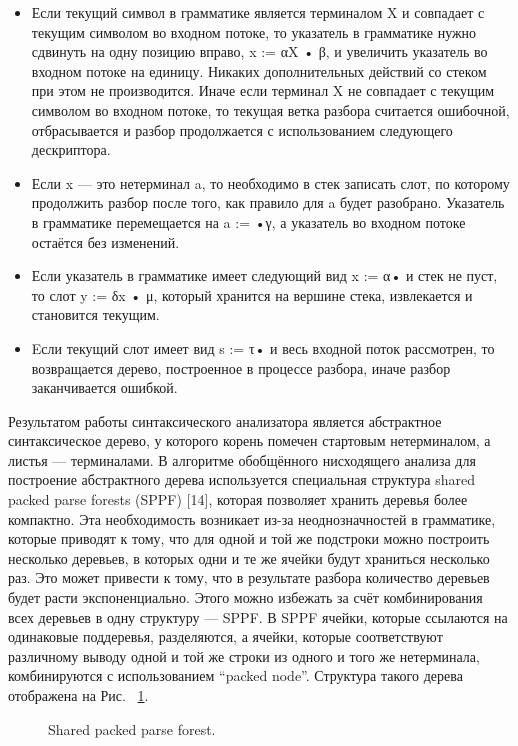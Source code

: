 \begin{itemize}
\item Если текущий символ в грамматике является терминалом X и совпадает с текущим символом во входном потоке, то указатель в грамматике нужно сдвинуть на одну позицию вправо, x := αX • β, и увеличить указатель во входном потоке на единицу. Никаких дополнительных действий со стеком при этом не производится. Иначе если терминал X не совпадает с текущим символом во входном потоке, то текущая ветка разбора считается ошибочной, отбрасывается и разбор продолжается с использованием следующего дескриптора.
\item Если x --- это нетерминал a, то необходимо в стек записать слот, по которому продолжить разбор после того, как правило для a будет разобрано. Указатель в грамматике перемещается на a := •γ, а указатель во входном потоке остаётся без изменений.
\item Если указатель в грамматике имеет следующий вид x := α• и стек не пуст, то слот y := δx • μ, который хранится на вершине стека, извлекается и становится текущим.
\item Eсли текущий слот имеет вид s := τ• и весь входной поток рассмотрен, то возвращается дерево, построенное в процессе разбора, иначе разбор заканчивается ошибкой.
\end{itemize}

Результатом работы синтаксического анализатора является абстрактное синтаксическое дерево, у которого корень помечен стартовым нетерминалом, а листья --- терминалами. В алгоритме обобщённого нисходящего анализа для построение абстрактного дерева используется специальная структура shared packed parse forests (SPPF) [14], которая позволяет хранить деревья более компактно. Эта необходимость возникает из-за неоднозначностей в грамматике, которые приводят к тому, что для одной и той же подстроки можно построить несколько деревьев, в которых одни и те же ячейки будут храниться несколько раз. Это может привести к тому, что в результате разбора количество деревьев будет расти экспоненциально. Этого можно избежать за счёт комбинирования всех деревьев в одну структуру --- SPPF. В SPPF ячейки, которые ссылаются на одинаковые поддеревья, разделяются, а ячейки, которые соответствуют различному выводу одной и той же строки из одного и того же нетерминала, комбинируются с использованием “packed node”. Структура такого дерева отображена на Рис. ~\ref{fig2}. 

\begin{figure}[h]
\caption{Shared packed parse forest.}
\label{fig2}
\end{figure}


